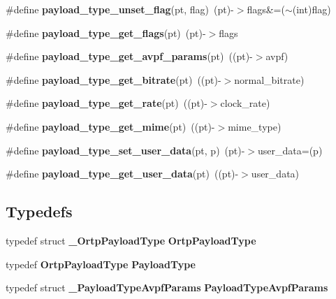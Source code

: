\begin{DoxyCompactItemize}
\mbox{\label{payloadtype_8h_ab7a18a5d0eb02af244946fa56516a492}} 
\#define {\bfseries payload\+\_\+type\+\_\+unset\+\_\+flag}(pt,  flag)~(pt)-\/$>$flags\&=($\sim$(int)flag)
\item 
\mbox{\label{payloadtype_8h_a0f8f96f5c3770229b7a2e54dca9f67ff}} 
\#define {\bfseries payload\+\_\+type\+\_\+get\+\_\+flags}(pt)~(pt)-\/$>$flags
\item 
\mbox{\label{payloadtype_8h_a8c5405f9f9269e5768accdb732690244}} 
\#define {\bfseries payload\+\_\+type\+\_\+get\+\_\+avpf\+\_\+params}(pt)~((pt)-\/$>$avpf)
\item 
\mbox{\label{payloadtype_8h_ac57bc0ade600d3c9071b8fb4068a6cb2}} 
\#define {\bfseries payload\+\_\+type\+\_\+get\+\_\+bitrate}(pt)~((pt)-\/$>$normal\+\_\+bitrate)
\item 
\mbox{\label{payloadtype_8h_aa66dc4a1c7f00b7288dee2453bdc8bf7}} 
\#define {\bfseries payload\+\_\+type\+\_\+get\+\_\+rate}(pt)~((pt)-\/$>$clock\+\_\+rate)
\item 
\mbox{\label{payloadtype_8h_ac1db56b4888885f45ca3b03f7cd3ba12}} 
\#define {\bfseries payload\+\_\+type\+\_\+get\+\_\+mime}(pt)~((pt)-\/$>$mime\+\_\+type)
\item 
\mbox{\label{payloadtype_8h_ab11c3def18ccc6baaec1d9be8414abc1}} 
\#define {\bfseries payload\+\_\+type\+\_\+set\+\_\+user\+\_\+data}(pt,  p)~(pt)-\/$>$user\+\_\+data=(p)
\item 
\mbox{\label{payloadtype_8h_af8f135f93157a35e93059dd33b893185}} 
\#define {\bfseries payload\+\_\+type\+\_\+get\+\_\+user\+\_\+data}(pt)~((pt)-\/$>$user\+\_\+data)
\end{DoxyCompactItemize}
\subsection*{Typedefs}
\begin{DoxyCompactItemize}
\item 
\mbox{\label{payloadtype_8h_a6757b4d5b890c86aab779a0460955ef0}} 
typedef struct \textbf{ \+\_\+\+Ortp\+Payload\+Type} {\bfseries Ortp\+Payload\+Type}
\item 
\mbox{\label{payloadtype_8h_a8db14f43d764ed86c9016a51adc5123c}} 
typedef \textbf{ Ortp\+Payload\+Type} {\bfseries Payload\+Type}
\item 
\mbox{\label{payloadtype_8h_a7118930b7700118c93d1ff1d84200417}} 
typedef struct \textbf{ \+\_\+\+Payload\+Type\+Avpf\+Params} {\bfseries Payload\+Type\+Avpf\+Params}
\end{DoxyCompactItemize}
